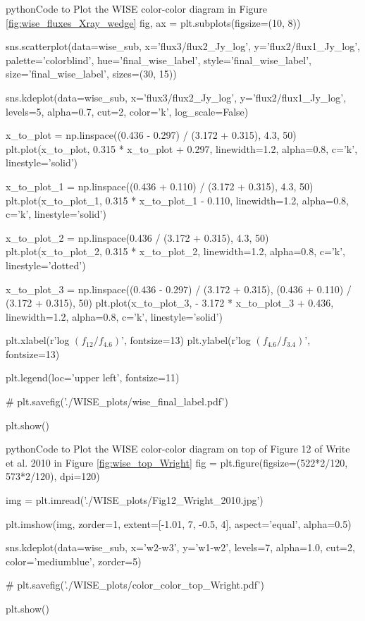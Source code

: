 \documentclass[letterpaper, oneside]{article}
\begin{document}
	\begin{sourcecode}[\label{wise_plot}]{python}{Code to Plot the WISE color-color diagram in Figure \ref{fig:wise_fluxes_Xray_wedge}}
	fig, ax = plt.subplots(figsize=(10, 8))
	
	sns.scatterplot(data=wise_sub, x='flux3/flux2_Jy_log', y='flux2/flux1_Jy_log', palette='colorblind', 
	hue='final_wise_label', style='final_wise_label', size='final_wise_label', sizes=(30, 15))
	
	sns.kdeplot(data=wise_sub, x='flux3/flux2_Jy_log', y='flux2/flux1_Jy_log', 
	levels=5, alpha=0.7, cut=2, color='k', log_scale=False)
	
	x_to_plot = np.linspace((0.436 - 0.297) / (3.172 + 0.315), 4.3, 50)
	plt.plot(x_to_plot, 0.315 * x_to_plot + 0.297, linewidth=1.2, alpha=0.8, c='k', linestyle='solid')
	
	x_to_plot_1 = np.linspace((0.436 + 0.110) / (3.172 + 0.315), 4.3, 50)
	plt.plot(x_to_plot_1, 0.315 * x_to_plot_1 - 0.110, linewidth=1.2, alpha=0.8, c='k', linestyle='solid')
	
	x_to_plot_2 = np.linspace(0.436 / (3.172 + 0.315), 4.3, 50)
	plt.plot(x_to_plot_2, 0.315 * x_to_plot_2, linewidth=1.2, alpha=0.8, c='k', linestyle='dotted')
	
	x_to_plot_3 = np.linspace((0.436 - 0.297) / (3.172 + 0.315), (0.436 + 0.110) / (3.172 + 0.315), 50)
	plt.plot(x_to_plot_3, - 3.172 * x_to_plot_3 + 0.436, linewidth=1.2, alpha=0.8, c='k', linestyle='solid')
	
	plt.xlabel(r'log $ \left ( f_{12} / f_{4.6} \right ) $', fontsize=13)
	plt.ylabel(r'log $ \left ( f_{4.6} / f_{3.4} \right ) $', fontsize=13)
	
	plt.legend(loc='upper left', fontsize=11)
	
	# plt.savefig('./WISE_plots/wise_final_label.pdf')
	
	plt.show()	
	\end{sourcecode}

	\begin{sourcecode}[\label{wise_Wright_plot}]{python}{Code to Plot the WISE color-color diagram on top of Figure 12 of Write et al. 2010 \cite{Wright_2010} in Figure \ref{fig:wise_top_Wright}}
	fig = plt.figure(figsize=(522*2/120, 573*2/120), dpi=120)
	
	img = plt.imread('./WISE_plots/Fig12_Wright_2010.jpg')
	
	plt.imshow(img, zorder=1, extent=[-1.01, 7, -0.5, 4], aspect='equal', alpha=0.5)
	
	sns.kdeplot(data=wise_sub, x='w2-w3', y='w1-w2', levels=7, alpha=1.0, cut=2, color='mediumblue', zorder=5)
	
	# plt.savefig('./WISE_plots/color_color_top_Wright.pdf')
	
	plt.show()
	\end{sourcecode}
\end{document}
